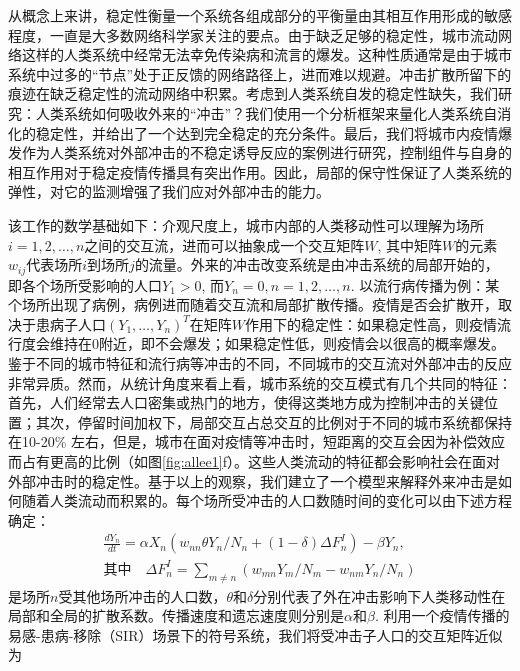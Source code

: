 从概念上来讲，稳定性衡量一个系统各组成部分的平衡量由其相互作用形成的敏感程度，一直是大多数网络科学家关注的要点。由于缺乏足够的稳定性，城市流动网络这样的人类系统中经常无法幸免传染病和流言的爆发。这种性质通常是由于城市系统中过多的“节点”处于正反馈的网络路径上，进而难以规避。冲击扩散所留下的痕迹在缺乏稳定性的流动网络中积累。考虑到人类系统自发的稳定性缺失，我们研究：人类系统如何吸收外来的“冲击”？我们使用一个分析框架来量化人类系统自消化的稳定性，并给出了一个达到完全稳定的充分条件。最后，我们将城市内疫情爆发作为人类系统对外部冲击的不稳定诱导反应的案例进行研究，控制组件与自身的相互作用对于稳定疫情传播具有突出作用。因此，局部的保守性保证了人类系统的弹性，对它的监测增强了我们应对外部冲击的能力。

该工作的数学基础如下：介观尺度上，城市内部的人类移动性可以理解为场所$i = 1,2,\dots,n$之间的交互流，进而可以抽象成一个交互矩阵$W$, 其中矩阵$W$的元素$w_{i j}$代表场所$i$到场所$j$的流量。外来的冲击改变系统是由冲击系统的局部开始的，即各个场所受影响的人口$Y_1>0$, 而$Y_n = 0, n = 1,2,\dots, n$. 以流行病传播为例：某个场所出现了病例，病例进而随着交互流和局部扩散传播。疫情是否会扩散开，取决于患病子人口$(Y_1,\dots,Y_n)^T$在矩阵$W$作用下的稳定性：如果稳定性高，则疫情流行度会维持在$0$附近，即不会爆发；如果稳定性低，则疫情会以很高的概率爆发。鉴于不同的城市特征和流行病等冲击的不同，不同城市的交互流对外部冲击的反应非常异质。然而，从统计角度来看上看，城市系统的交互模式有几个共同的特征：首先，人们经常去人口密集或热门的地方，使得这类地方成为控制冲击的关键位置；其次，停留时间加权下，局部交互占总交互的比例对于不同的城市系统都保持在10-20\% 左右，但是，城市在面对疫情等冲击时，短距离的交互会因为补偿效应而占有更高的比例（如图\ref{fig:allee1}f）。这些人类流动的特征都会影响社会在面对外部冲击时的稳定性。基于以上的观察，我们建立了一个模型来解释外来冲击是如何随着人类流动而积累的。每个场所受冲击的人口数随时间的变化可以由下述方程确定：\begin{equation}
    \begin{split}
        \frac{d Y_n}{d t} = \alpha X_n (w_{nn} \theta Y_n / N_n + (1-\delta) \Delta F_n^I) - \beta Y_n, \\
        \text{其中}\quad \Delta F_n^I = \sum_{m \ne n} (w_{mn} Y_m / N_m - w_{nm} Y_n / N_n)
    \end{split}\label{eq:allee_basic}
\end{equation}是场所$n$受其他场所冲击的人口数，$\theta$和$\delta$分别代表了外在冲击影响下人类移动性在局部和全局的扩散系数。传播速度和遗忘速度则分别是$\alpha$和$\beta$. 利用一个疫情传播的易感-患病-移除（SIR）场景下的符号系统，我们将受冲击子人口的交互矩阵近似为\begin{equation}

\end{equation}
